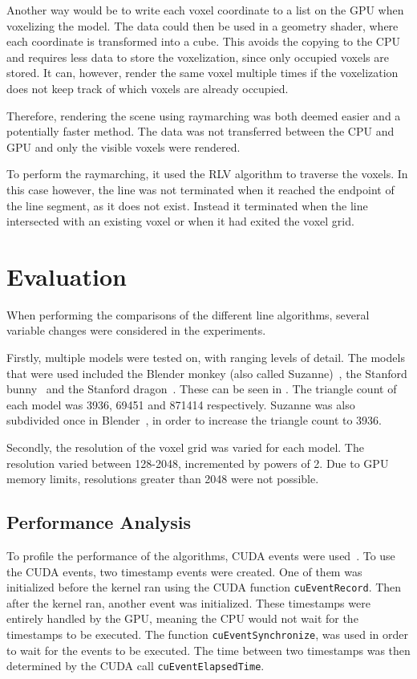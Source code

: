 Another way would be to write each voxel coordinate to a list on the GPU when voxelizing the model.
The data could then be used in a geometry shader, where each coordinate is transformed into a cube.
This avoids the copying to the CPU and requires less data to store the voxelization, since only occupied voxels are stored.
It can, however, render the same voxel multiple times if the voxelization does not keep track of which voxels are already occupied.

Therefore, rendering the scene using raymarching was both deemed easier and a potentially faster method.
The data was not transferred between the CPU and GPU and only the visible voxels were rendered.

To perform the raymarching, it used the RLV algorithm to traverse the voxels.
In this case however, the line was not terminated when it reached the endpoint of the line segment, as it does not exist.
Instead it terminated when the line intersected with an existing voxel or when it had exited the voxel grid.

\section{Evaluation}
When performing the comparisons of the different line algorithms, several variable changes were considered in the experiments.

Firstly, multiple models were tested on, with ranging levels of detail.
The models that were used included the Blender monkey (also called Suzanne)~\cite{blender-monkey}, the Stanford bunny~\cite{stanford-rep} and the Stanford dragon~\cite{stanford-rep}.
These can be seen in .
The triangle count of each model was 3936, 69451 and 871414 respectively.
Suzanne was also subdivided once in Blender~\cite{blender}, in order to increase the triangle count to 3936.

Secondly, the resolution of the voxel grid was varied for each model.
The resolution varied between 128-2048, incremented by powers of 2.
Due to GPU memory limits, resolutions greater than 2048 were not possible.



\subsection{Performance Analysis}
To profile the performance of the algorithms, CUDA events were used~\cite{cuda-profiling}.
To use the CUDA events, two timestamp events were created.
One of them was initialized before the kernel ran using the CUDA function \texttt{cuEventRecord}.
Then after the kernel ran, another event was initialized.
These timestamps were entirely handled by the GPU, meaning the CPU would not wait for the timestamps to be executed.
The function \texttt{cuEventSynchronize}, was used in order to wait for the events to be executed.
The time between two timestamps was then determined by the CUDA call \texttt{cuEventElapsedTime}.


